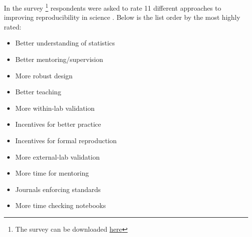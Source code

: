 \documentclass[
]{article}
\providecommand{\tightlist}{%
  \setlength{\itemsep}{0pt}\setlength{\parskip}{0pt}}
\begin{document}
\hfill\break
In the survey \footnote{The survey can be downloaded
  \href{Reproduciblility\%20Questionnaire.xml}{here}} respondents were
asked to rate 11 different approaches to improving reproducibility in
science . Below is the list order by the most highly rated:

\begin{itemize}
\tightlist
\item
  Better understanding of statistics
\item
  Better mentoring/supervision
\item
  More robust design
\item
  Better teaching
\item
  More within-lab validation
\item
  Incentives for better practice
\item
  Incentives for formal reproduction
\item
  More external-lab validation
\item
  More time for mentoring
\item
  Journals enforcing standards
\item
  More time checking notebooks
\end{itemize}
\end{document}
